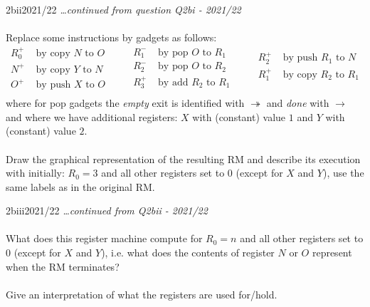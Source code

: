 \begin{exambox}{2bii}{2021/22}
	\textit{\dots continued from question Q2bi - 2021/22}
	\\
	\\ Replace some instructions by gadgets as follows:
	\[\begin{split}
			R_0^+ & \text{ by copy } N \text{ to } O \\
			N^+   & \text{ by copy } Y \text{ to } N \\
			O^+   & \text{ by push } X \text{ to } O \\
		\end{split} \qquad \begin{split}
			R_1^- & \text{ by pop }  O \text{ to } R_1 \\
			R_2^- & \text{ by pop }  O \text{ to } R_2 \\
			R_3^+ & \text{ by add }R_2 \text{ to } R_1 \\
		\end{split} \qquad \begin{split}
			R_2^+ & \text{ by push }R_1 \text{ to } N \\
			R_1^+ & \text{ by copy } R_2 \text{ to } R_1 \\
			\\
		\end{split}\]
	where for pop gadgets the \textit{empty} exit is identified with $\twoheadrightarrow$  and \textit{done}
	with $\to$ and where we have additional registers: $X$ with (constant) value $1$
	and $Y$ with (constant) value $2$.
	\\
	\\ Draw the graphical representation of the resulting RM and describe its
	execution with initially: $R_0 = 3$ and all other registers set to $0$ (except for
	$X$ and $Y$), use the same labels as in the original RM.
\end{exambox}

\begin{exambox}{2biii}{2021/22}
	\textit{\dots continued from Q2bii - 2021/22}
	\\
	\\ What does this register machine compute for $R_0 = n$ and all other registers
	set to $0$ (except for $X$ and $Y$), i.e. what does the contents of register $N$ or $O$
	represent when the RM terminates?
	\\
	\\Give an interpretation of what the registers are used for/hold.
\end{exambox}

